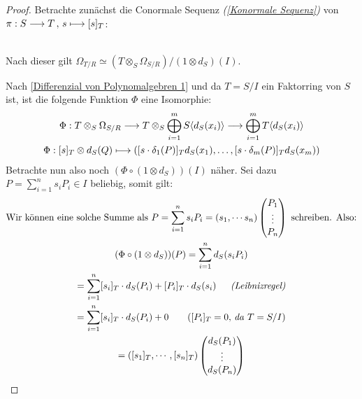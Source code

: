 \documentclass[10pt,a4paper]{report}
\newcommand{\functionback}[3]{\nolinebreak{#1:#2 \longmapsto #3}}
\newcommand{\function}[5]{\nolinebreak{#1:#2 \longrightarrow #3 \, , \, #4 \longmapsto #5}}
\newcommand{\divR}[2]{\Omega_{#1/#2}}
\newcommand{\divf}[1]{d_{#1}}
\newcommand{\Tensor}[3]{#1 \otimes_{#2} #3}
\newcommand{\tensor}[3]{#1 \otimes #3}
\begin{document}
\begin{proof}
Betrachte zunächst die Conormale Sequenz \textit{(\cref{Konormale Sequenz})} von $\function{\pi}{S}{T}{s}{[s]_T}$:
\begin{center}
\ \\
Nach dieser gilt $\divR{T}{R} \simeq (\Tensor{T}{S}{\divR{S}{R}}) / (\tensor{1}{S}{d_{S}})(I)$.
\end{center}
Nach \cref{Differenzial von Polynomalgebren 1} und da $T = S/I$ ein Faktorring von $S$ ist, ist die folgende Funktion $\Phi$ eine Isomorphie:
\begin{gather*}
\Phi: 
\Tensor{T}{S}{\divR{S}{R}} 
\longrightarrow \Tensor{T}{S}{\bigoplus_{i = 1}^m S \langle \divf{S}(x_i) \rangle} 
\longrightarrow \bigoplus_{i = 1}^m T \langle \divf{S}(x_i) \rangle\\
\functionback{\Phi}{\tensor{[s]_T}{}{\divf{S}(Q)}}{([s \cdot \delta_{1}(P)]_T\divf{S}(x_1), \dots , [s \cdot \delta_{m}(P)]_T\divf{S}(x_m))}
\end{gather*}
Betrachte nun also noch $(\Phi \circ (\tensor{1}{S}{d_{S}}))(I)$ näher. Sei dazu $P = \sum_{i = 1}^n s_iP_i \in I$ beliebig, somit gilt:
\begin{gather*}
\text{Wir können eine solche Summe als } P = \sum_{i = 1}^n s_iP_i = (s_1, \cdots s_n)
\begin{pmatrix}
P_1\\
\vdots\\
P_n
\end{pmatrix}
\text{ schreiben. Also:} \\
(\Phi \circ (\tensor{1}{S}{d_{S}}))(P)
= \sum_{i = 1}^n \divf{S}(s_iP_i)\\
= \sum_{i = 1}^n [s_i]_T \cdot \divf{S}(P_i) + [P_i]_T \cdot \divf{S}(s_i) \textit{\hspace{1,5em}(Leibnizregel)}\\
= \sum_{i = 1}^n [s_i]_T \cdot \divf{S}(P_i) + 0 \text{\hspace{2em}($[P_i]_T = 0$, \textit{da} $T = S/I$)} \\
= ([s_1]_T , \cdots , [s_n]_T)
\begin{pmatrix}
\divf{S}(P_1)\\
\vdots\\
\divf{S}(P_n)
\end{pmatrix}\\

\end{gather*}
\end{proof}
\end{document}
